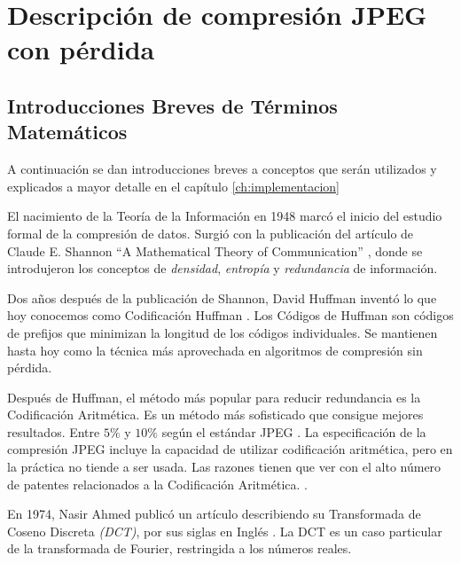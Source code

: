\chapter{Descripción de compresión JPEG con pérdida}\label{ch:jpeg_desc}

\section{Introducciones Breves de Términos Matemáticos}

A continuación se dan introducciones breves a conceptos que serán utilizados y
explicados a mayor detalle en el capítulo \ref{ch:implementacion}

El nacimiento de la Teoría de la Información en 1948 marcó el inicio del
estudio formal de la compresión de datos. Surgió con la publicación del
artículo de Claude E.  Shannon ``A Mathematical Theory of Communication''
\cite{shannon}, donde se introdujeron los conceptos de \emph{densidad},
\emph{entropía} y \emph{redundancia} de información.


Dos años después de la publicación de Shannon, David Huffman inventó lo que hoy
conocemos como Codificación Huffman \cite{Huffman}. Los \gls{Códigos de Huffman} son
códigos de prefijos que minimizan la longitud de los códigos individuales. Se
mantienen hasta hoy como la técnica más aprovechada en algoritmos de compresión
sin pérdida.

Después de Huffman, el método más popular para reducir redundancia es la
\gls{Codificación Aritmética}. Es un método más sofisticado que consigue mejores
resultados. Entre $5\%$ y $10\%$ según el estándar JPEG \cite{jpeg-spec}. La
especificación de la compresión JPEG incluye la capacidad de utilizar
codificación aritmética, pero en la práctica no tiende a ser usada. Las razones
tienen que ver con el alto número de patentes relacionados a la Codificación
Aritmética. \cite{jpeg_patents}.

En 1974, Nasir Ahmed publicó un artículo describiendo su Transformada de Coseno
Discreta \emph{(DCT)}, por sus siglas en Inglés \cite{ahmed_dct}. La \gls{DCT} es un
caso particular de la transformada de Fourier, restringida a los números
reales.

